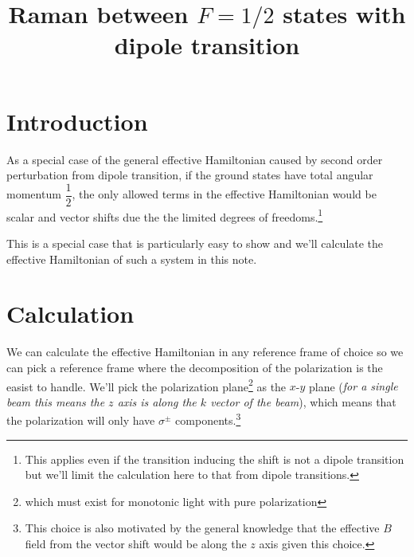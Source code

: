 \documentclass[10pt,fleqn]{article}
\title{Raman between $F=1/2$ states with dipole transition}
\begin{document}
\maketitle

\section{Introduction}
As a special case of the general effective Hamiltonian caused by second order
perturbation from dipole transition,
if the ground states have total angular momentum $\dfrac12$,
the only allowed terms in the effective Hamiltonian would be scalar and vector shifts
due the the limited degrees of freedoms.\footnote{This applies even if the transition
  inducing the shift is not a dipole transition but we'll limit the calculation here
  to that from dipole transitions.}

This is a special case that is particularly easy to show and we'll calculate
the effective Hamiltonian of such a system in this note.

\section{Calculation}
We can calculate the effective Hamiltonian in any reference frame of choice
so we can pick a reference frame where the decomposition of the polarization
is the easist to handle. We'll pick the polarization plane\footnote{which must exist
  for monotonic light with pure polarization} as the $x$-$y$ plane
(\textit{for a single beam this means the $z$ axis
  is along the $k$ vector of the beam}),
which means that the polarization will only have $\sigma^\pm$ components.\footnote{
  This choice is also motivated by the general knowledge that the effective $B$
  field from the vector shift would be along the $z$ axis given this choice.
}
\end{document}
